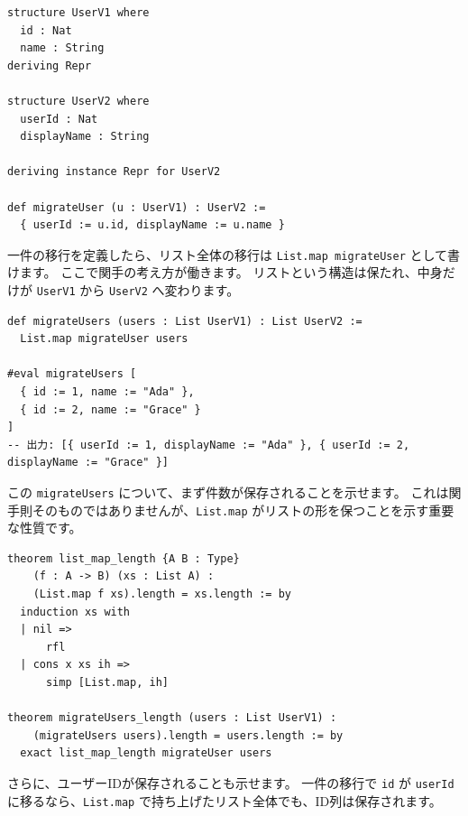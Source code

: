 \begin{listing}[htbp]
\begin{verbatim}
structure UserV1 where
  id : Nat
  name : String
deriving Repr

structure UserV2 where
  userId : Nat
  displayName : String

deriving instance Repr for UserV2

def migrateUser (u : UserV1) : UserV2 :=
  { userId := u.id, displayName := u.name }
\end{verbatim}
\caption{\texttt{migrateUser}}
\label{lst:ch14_user_migration_one}
\end{listing}

一件の移行を定義したら、リスト全体の移行は \texttt{List.map migrateUser} として書けます。
ここで関手の考え方が働きます。
リストという構造は保たれ、中身だけが \texttt{UserV1} から \texttt{UserV2} へ変わります。

\begin{listing}[htbp]
\begin{verbatim}
def migrateUsers (users : List UserV1) : List UserV2 :=
  List.map migrateUser users

#eval migrateUsers [
  { id := 1, name := "Ada" },
  { id := 2, name := "Grace" }
]
-- 出力: [{ userId := 1, displayName := "Ada" }, { userId := 2, displayName := "Grace" }]
\end{verbatim}
\caption{\texttt{migrateUsers}}
\label{lst:ch14_user_migration_list}
\end{listing}

この \texttt{migrateUsers} について、まず件数が保存されることを示せます。
これは関手則そのものではありませんが、\texttt{List.map} がリストの形を保つことを示す重要な性質です。

\begin{listing}[htbp]
\begin{verbatim}
theorem list_map_length {A B : Type}
    (f : A -> B) (xs : List A) :
    (List.map f xs).length = xs.length := by
  induction xs with
  | nil =>
      rfl
  | cons x xs ih =>
      simp [List.map, ih]

theorem migrateUsers_length (users : List UserV1) :
    (migrateUsers users).length = users.length := by
  exact list_map_length migrateUser users
\end{verbatim}
\caption{\texttt{list\_map\_length} と \texttt{migrateUsers\_length}}
\label{lst:ch14_list_map_length}
\end{listing}

さらに、ユーザーIDが保存されることも示せます。
一件の移行で \texttt{id} が \texttt{userId} に移るなら、\texttt{List.map} で持ち上げたリスト全体でも、ID列は保存されます。

